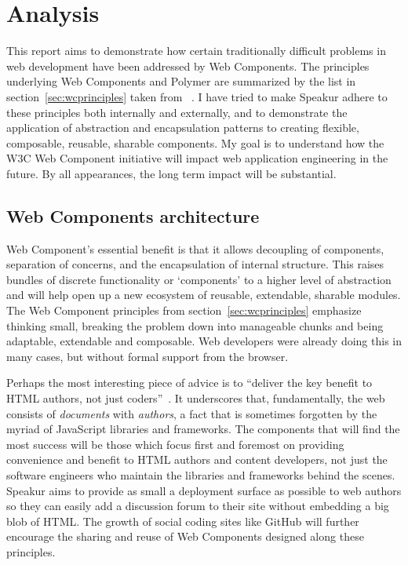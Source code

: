 \chapter{Analysis}
%

This report aims to demonstrate how certain traditionally difficult problems in web development have been addressed by Web Components.
The principles underlying Web Components and Polymer are summarized by the list in section~\ref{sec:wcprinciples} taken from ~\cite{webcomponentscontributors2014}.
I have tried to make Speakur adhere to these principles both internally and externally,
and to demonstrate the application of abstraction and encapsulation patterns to creating flexible, composable, reusable, sharable components.
My goal is to understand how the W3C Web Component initiative will impact web application engineering in the future.
By all appearances, the long term impact will be substantial.

\section{Web Components architecture}
Web Component's essential benefit is that it allows decoupling of components, 
separation of concerns, 
and the encapsulation of internal structure.
This raises bundles of discrete functionality or `components' to a higher level of abstraction and 
will help open up a new ecosystem of reusable, extendable, sharable modules.
The Web Component principles from section~\ref{sec:wcprinciples} emphasize thinking small, 
breaking the problem down into manageable chunks and being adaptable, extendable and composable.
Web developers were already doing this in many cases, but without formal support from the browser.

Perhaps the most interesting piece of advice is to ``deliver the key benefit to HTML authors, not just coders''~\cite{webcomponentscontributors2014}.
It underscores that, fundamentally, 
the web consists of \textit{documents} with \textit{authors}, 
a fact that is sometimes forgotten by the myriad of JavaScript libraries and frameworks.
The components that will find the most success will be those which focus first and foremost on providing convenience and benefit to HTML authors and content developers, 
not just the software engineers who maintain the libraries and frameworks behind the scenes.
Speakur aims to provide as small a deployment surface as possible to web authors so they can easily add a discussion forum to their site without embedding a big blob of HTML.
The growth of social coding sites like GitHub will further encourage the sharing and reuse of Web Components designed along these principles.

